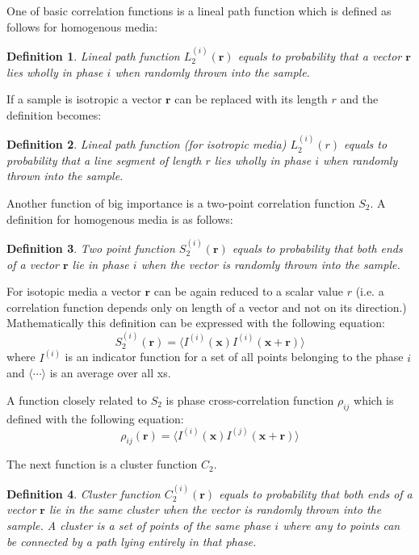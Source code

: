 \documentclass[reprint,amsmath,amssymb,aps,pre,showkeys,showpacs,nofootinbib]{revtex4-1}
\newtheorem{definition}{Definition}
\begin{document}
One of basic correlation functions is a lineal path function which is defined as
follows for homogenous media:
\begin{definition}
  Lineal path function $L_2^{(i)}(\mathbf{r})$ equals to probability that a
  vector $\mathbf{r}$ lies wholly in phase $i$ when randomly thrown into the
  sample.
\end{definition}
If a sample is isotropic a vector $\mathbf{r}$ can be replaced with its length
$r$ and the definition becomes:
\begin{definition}
  Lineal path function (for isotropic media) $L_2^{(i)}(r)$ equals to
  probability that a line segment of length $r$ lies wholly in phase $i$ when
  randomly thrown into the sample.
\end{definition}

Another function of big importance is a two-point correlation function $S_2$. A
definition for homogenous media is as follows:
\begin{definition}
  Two point function $S_2^{(i)}(\mathbf{r})$ equals to probability that both ends
  of a vector $\mathbf{r}$ lie in phase $i$ when the vector is randomly thrown
  into the sample.
\end{definition}
For isotopic media a vector $\mathbf{r}$ can be again reduced to a scalar value
$r$ (i.e. a correlation function depends only on length of a vector and not on
its direction.) Mathematically this definition can be expressed with the
following equation:
\begin{equation}
  S_2^{(i)}(\mathbf{r}) = \langle I^{(i)}(\mathbf{x}) I^{(i)}(\mathbf{x} +
  \mathbf{r}) \rangle
  \label{eq:s2-def}
\end{equation}
where $I^{(i)}$ is an indicator function for a set of all points belonging to
the phase $i$ and $\langle \cdots \rangle$ is an average over all xs.

A function closely related to $S_2$ is phase cross-correlation function
$\rho_{ij}$ which is defined with the following equation:
\begin{equation}
  \rho_{ij}(\mathbf{r}) = \langle I^{(i)}(\mathbf{x}) I^{(j)}(\mathbf{x} +
  \mathbf{r}) \rangle
  \label{eq:cross-def}
\end{equation}

The next function is a cluster function $C_2$.
\begin{definition}
  Cluster function $C_2^{(i)}(\mathbf{r})$ equals to probability that both
  ends of a vector $\mathbf{r}$ lie in the same cluster when the vector is
  randomly thrown into the sample. A cluster is a set of points of the same
  phase $i$ where any to points can be connected by a path lying entirely in
  that phase.
\end{definition}
\end{document}
